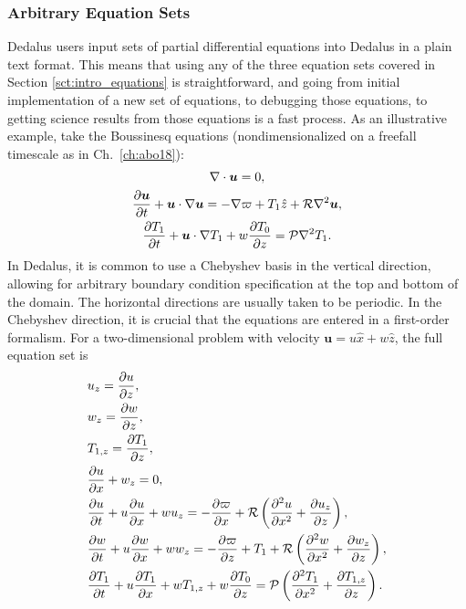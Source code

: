 \subsubsection{Arbitrary Equation Sets}
Dedalus users input sets of partial differential equations into Dedalus in a plain text format.
This means that using any of the three equation sets covered in Section \ref{sct:intro_equations} is straightforward, and going from initial implementation of a new set of equations, to debugging those equations, to getting science results from those equations is a fast process.
As an illustrative example, take the Boussinesq equations (nondimensionalized on a freefall timescale as in Ch.~\ref{ch:abo18}):
\begin{gather}
\nabla\cdot\bm{u} = 0, \\
\frac{\partial \bm{u}}{\partial t} + \bm{u}\cdot\nabla \bm{u} = -\nabla\varpi + T_1 \hat{z} + \mathcal{R} \nabla^2\bm{u}, \\
\frac{\partial T_1}{\partial t} + \bm{u}\cdot\nabla T_1 + w\frac{\partial T_0}{\partial z} = \mathcal{P} \nabla^2 T_1.
\end{gather}
In Dedalus, it is common to use a Chebyshev basis in the vertical direction, allowing for arbitrary boundary condition specification at the top and bottom of the domain.
The horizontal directions are usually taken to be periodic.
In the Chebyshev direction, it is crucial that the equations are entered in a first-order formalism.
For a two-dimensional problem with velocity $\bm{u} = u\hat{x} + w\hat{z}$, the full equation set is
\begin{align}
&u_z = \frac{\partial u}{\partial z}, \label{eqn:dedalus1} \\
&w_z = \frac{\partial w}{\partial z}, \\
&T_{1,z} = \frac{\partial T_1}{\partial z}, \\
&\frac{\partial u}{\partial x} + w_z = 0, \\
&\frac{\partial u}{\partial t} + u\frac{\partial u}{\partial x} + w u_z = -\frac{\partial \varpi}{\partial x} + \mathcal{R} \left(\frac{\partial^2 u}{\partial x^2} + \frac{\partial u_z}{\partial z}\right),\\
&\frac{\partial w}{\partial t} + u\frac{\partial w}{\partial x} + w w_z = -\frac{\partial \varpi}{\partial z} + T_1 + \mathcal{R} \left(\frac{\partial^2 w}{\partial x^2} + \frac{\partial w_z}{\partial z}\right),\\
&\frac{\partial T_1}{\partial t} + u\frac{\partial T_1}{\partial x} + w T_{1,z}  + w \frac{\partial T_0}{\partial z} = \mathcal{P} \left(\frac{\partial^2 T_1}{\partial x^2} + \frac{\partial T_{1,z}}{\partial z}\right) \label{eqn:dedalus7}.
\end{align}

